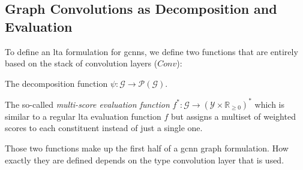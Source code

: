 \subsection{Graph Convolutions as Decomposition and Evaluation}%
\label{sec:ltag:formulation:gcnn:conv}

To define an \ac{lta} formulation for \acp{gcnn}, we define two functions that are entirely based on the stack of convolution layers ($\mathit{Conv}$):
\begin{enumerate*}[label={\circled{\small\arabic*}}]
	\item The decomposition function $\psi: \mathcal{G} \to \mathcal{P}(\mathcal{G})$.
	\item The so-called \textit{multi-score evaluation function} $f^{*}: \mathcal{G} \to {(\mathcal{Y} \times \mathbb{R}_{\geq 0})}^{*}$ which is similar to a regular \ac{lta} evaluation function $f$ but assigns a multiset of weighted scores to each constituent instead of just a single one.
\end{enumerate*}
Those two functions make up the first half of a \ac{gcnn} graph formulation.
How exactly they are defined depends on the type convolution layer that is used.

